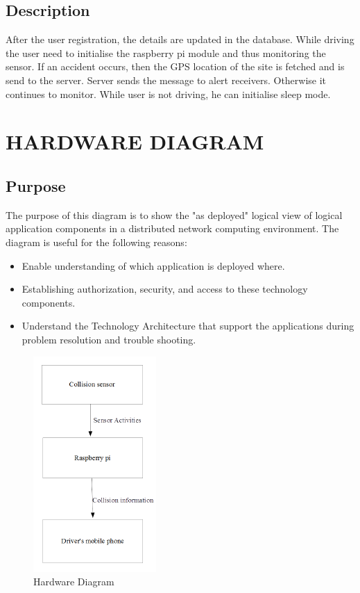 \documentclass[12pt,a4paper,oneside]{report}
\begin{document}
{\subsection{Description}
\par After the user registration, the details are updated in the database. While driving the user need to
initialise the raspberry pi module and thus monitoring the sensor. If an accident occurs, then the GPS location of the site is fetched and is send to the server. Server sends the message to alert receivers. Otherwise it continues to monitor. While user is not driving, he can initialise sleep mode.

\newpage
\section{HARDWARE DIAGRAM}
\subsection{Purpose}
\par The purpose of this diagram is to show the "as deployed" logical view of logical application components in a distributed network computing environment. The diagram is useful for the following reasons:
\begin{itemize}
\item Enable understanding of which application is deployed where.
\item Establishing authorization, security, and access to these technology components.
\item Understand the Technology Architecture that support the applications during problem resolution and trouble shooting.
\end{itemize}
\begin{figure}[h]
\begin{center}
\includegraphics[scale=1]{hw.png}
\caption{  Hardware Diagram }
\label{  Hardware Diagram}
\end{center}
\end{figure}
}
\end{document}
